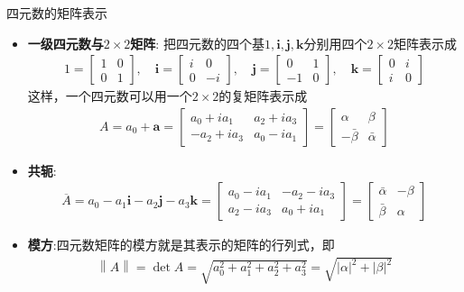 \documentclass[UTF8,AutoFakeBold,AutoFakeSlant]{beamer}
\begin{document}
\begin{frame}{四元数的矩阵表示}
    \begin{itemize}
        \scriptsize
        \item \textbf{一级四元数与$2\times 2$矩阵}: 把四元数的四个基$1,\mathbf{i},\mathbf{j},\mathbf{k}$分别用四个$2\times 2$矩阵表示成
              \begin{align*}
                  1=\begin{bmatrix} 1 & 0\\ 0 & 1\end{bmatrix}, \quad\mathbf{i}=\begin{bmatrix} i & 0\\ 0 & -i\end{bmatrix},\quad\mathbf{j}=\begin{bmatrix} 0 & 1\\ -1 & 0\end{bmatrix},\quad\mathbf{k}=\begin{bmatrix} 0 & i\\ i & 0\end{bmatrix}
              \end{align*}
              这样，一个四元数可以用一个$2\times 2$的复矩阵表示成
              \begin{align*}
                  A=a_0+\mathbf{a}=\begin{bmatrix} a_0+ia_1 & a_2+ia_3\\ -a_2+ia_3 & a_0-ia_1\end{bmatrix}=\begin{bmatrix} \alpha & \beta\\ -\bar{\beta} & \bar{\alpha}\end{bmatrix}
              \end{align*}
        \item \textbf{共轭}:
              \begin{align*}
                  \overline{A}=a_0-a_1\mathbf{i}-a_2\mathbf{j}-a_3\mathbf{k}=\begin{bmatrix} a_0-ia_1 & -a_2-ia_3\\ a_2-ia_3 & a_0+ia_1\end{bmatrix}=\begin{bmatrix} \bar{\alpha} & -\beta\\ \bar{\beta} & \alpha\end{bmatrix}
              \end{align*}
        \item \textbf{模方}:四元数矩阵的模方就是其表示的矩阵的行列式，即
              \begin{align*}
                  \left\|A\right\|=\det A=\sqrt{a_0^2+a_1^2+a_2^2+a_3^2}=\sqrt{\left|\alpha\right|^2+\left|\beta\right|^2}
              \end{align*}

    \end{itemize}
\end{frame}
\end{document}
